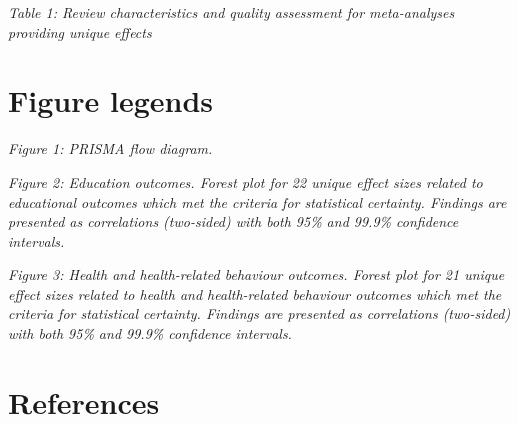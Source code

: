 \documentclass[
  english,
  man]{apa6}
\begin{document}
\emph{Table 1: Review characteristics and quality assessment for meta-analyses providing unique effects}

\hypertarget{figure-legends}{%
\section{Figure legends}\label{figure-legends}}

\emph{Figure 1: PRISMA flow diagram.}

\emph{Figure 2: Education outcomes. Forest plot for 22 unique effect sizes related to educational outcomes which met the criteria for statistical certainty. Findings are presented as correlations (two-sided) with both 95\% and 99.9\% confidence intervals.}

\emph{Figure 3: Health and health-related behaviour outcomes. Forest plot for 21 unique effect sizes related to health and health-related behaviour outcomes which met the criteria for statistical certainty. Findings are presented as correlations (two-sided) with both 95\% and 99.9\% confidence intervals.}

\newpage

\hypertarget{references}{%
\section{References}\label{references}}
\end{document}

